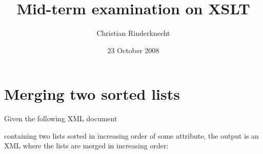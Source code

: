 \documentclass[11pt,a4paper]{article}
\title{Mid-term examination on XSLT}
\author{Christian Rinderknecht}
\date{23 October 2008}
\newcommand\XML{\textsf{XML}\xspace}
\begin{document}
\maketitle

\thispagestyle{empty}

\section{Merging two sorted lists}

Given the following \XML document


\noindent containing two lists sorted in increasing order of some
attribute, the output is an \XML where the lists are merged in
increasing order:

\end{document}

